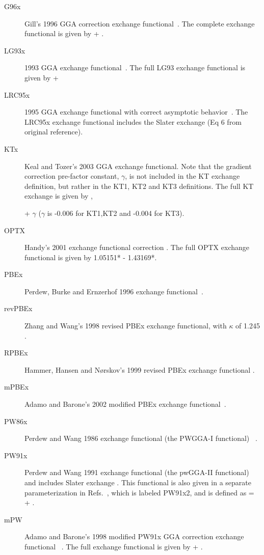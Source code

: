 \begin{description}
\item[G96x] Gill's 1996 GGA correction exchange functional~\cite{dft:g96}.
  The complete exchange functional is given by  + .

\item[LG93x] 1993 GGA exchange functional~\cite{dft:lg93,dft:g961lyp}.
  The full LG93 exchange functional is given by  +  

\item[LRC95x] 1995 GGA exchange functional with correct asymptotic behavior~\cite{dft:lrc95}.
  The LRC95x exchange functional includes the Slater exchange (Eq 6 from original reference).

\item[KTx] Keal and Tozer's 2003 GGA exchange functional. Note that the gradient correction 
  pre-factor constant, $\gamma$, is not included in the KT exchange 
  definition, but rather in the KT1, KT2 and KT3 definitions. The full KT exchange is given by 
  \cite{dft:kt12},

   + $\gamma$ ($\gamma$ is -0.006 for KT1,KT2 and -0.004 for KT3). 

\item[OPTX] Handy's 2001 exchange functional correction \cite{dft:optx}.
  The full OPTX exchange functional is given by 
  1.05151* - 1.43169*.

\item[PBEx] Perdew, Burke and Ernzerhof 1996 exchange functional~\cite{dft:pbe}.

\item[revPBEx] Zhang and Wang's 1998 revised PBEx exchange functional, with $\kappa$ of 1.245
  \cite{dft:revpbe}.

\item[RPBEx] Hammer, Hansen and N{\o}rskov's 1999 revised PBEx exchange functional 
  \cite{dft:revpbe}.

\item[mPBEx] Adamo and Barone's 2002 modified PBEx exchange functional~\cite{dft:mpbe}.

\item[PW86x] Perdew and Wang 1986 exchange functional (the PWGGA-I functional)
  ~\cite{dft:pw86x}.

\item[PW91x] Perdew and Wang 1991 exchange functional (the pwGGA-II functional)
  and includes Slater exchange \cite{dft:pw91}. This functional is 
  also given in a separate parameterization in Refs.~\cite{dft:g96,dft:mpw},
  which is labeled PW91x2, and is defined as 
   =  + .

\item[mPW] Adamo and Barone's 1998 modified PW91x GGA correction exchange functional
  ~\cite{dft:pw91,dft:mpw}. The full exchange functional is given by
   + .

\end{description}

